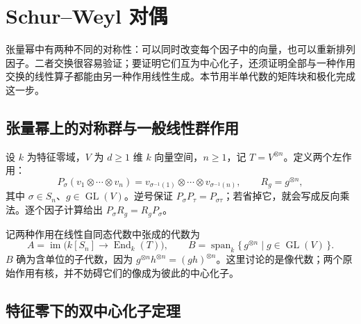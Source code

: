 \section{Schur–Weyl 对偶}
\label{b5:sec:0703}

张量幂中有两种不同的对称性：可以同时改变每个因子中的向量，也可以重新排列因子。二者交换很容易验证；要证明它们互为中心化子，还须证明全部与一种作用交换的线性算子都能由另一种作用线性生成。本节用半单代数的矩阵块和极化完成这一步。

\subsection{张量幂上的对称群与一般线性群作用}
\label{b5:subsec:0703:01}

设 \(k\) 为特征零域，\(V\) 为 \(d\ge1\) 维 \(k\) 向量空间，\(n\ge1\)，记 \(T=V^{\otimes n}\)。定义两个左作用：
\[
	P_\sigma(v_1\otimes\cdots\otimes v_n) =v_{\sigma^{-1}(1)}\otimes\cdots\otimes v_{\sigma^{-1}(n)}, \qquad R_g=g^{\otimes n},
\]
其中 \(\sigma\in S_n\)、\(g\in\operatorname{GL}(V)\)。逆号保证 \(P_\sigma P_\tau=P_{\sigma\tau}\)；若省掉它，就会写成反向乘法。逐个因子计算给出 \(P_\sigma R_g=R_gP_\sigma\)。

\ProseParagraphBreak
记两种作用在线性自同态代数中张成的代数为
\[
	A=\operatorname{im}\bigl(k[S_n]\longrightarrow\operatorname{End}_k(T)\bigr), \qquad B=\operatorname{span}_k\bigl\{\,g^{\otimes n}\mid g\in\operatorname{GL}(V)\,\bigr\}.
\]
\(B\) 确为含单位的子代数，因为 \(g^{\otimes n}h^{\otimes n}=(gh)^{\otimes n}\)。这里讨论的是像代数；两个原始作用有核，并不妨碍它们的像成为彼此的中心化子。

\subsection{特征零下的双中心化子定理}
\label{b5:subsec:0703:02}

